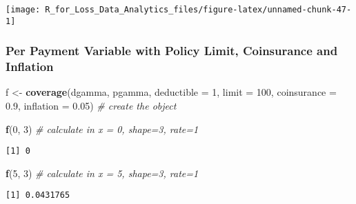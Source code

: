 \documentclass[]{book}
\newenvironment{Shaded}{\begin{snugshade}}{\end{snugshade}}
\newcommand{\KeywordTok}[1]{\textcolor[rgb]{0.13,0.29,0.53}{\textbf{#1}}}
\newcommand{\DataTypeTok}[1]{\textcolor[rgb]{0.13,0.29,0.53}{#1}}
\newcommand{\DecValTok}[1]{\textcolor[rgb]{0.00,0.00,0.81}{#1}}
\newcommand{\FloatTok}[1]{\textcolor[rgb]{0.00,0.00,0.81}{#1}}
\newcommand{\StringTok}[1]{\textcolor[rgb]{0.31,0.60,0.02}{#1}}
\newcommand{\CommentTok}[1]{\textcolor[rgb]{0.56,0.35,0.01}{\textit{#1}}}
\newcommand{\NormalTok}[1]{#1}
\theoremstyle{definition}
\theoremstyle{definition}
\theoremstyle{definition}
\theoremstyle{remark}
\begin{document}
\begin{center}\texttt{[image: R\_for\_Loss\_Data\_Analytics\_files/figure-latex/unnamed-chunk-47-1]} \end{center}

\subsubsection{Per Payment Variable with Policy Limit, Coinsurance and
Inflation}\label{per-payment-variable-with-policy-limit-coinsurance-and-inflation}

\begin{Shaded}
\begin{Highlighting}[]
\NormalTok{f <-}\StringTok{ }\KeywordTok{coverage}\NormalTok{(dgamma, pgamma, }\DataTypeTok{deductible =} \DecValTok{1}\NormalTok{, }\DataTypeTok{limit =} \DecValTok{100}\NormalTok{, }\DataTypeTok{coinsurance =} \FloatTok{0.9}\NormalTok{, }\DataTypeTok{inflation =} \FloatTok{0.05}\NormalTok{) }\CommentTok{# create the object}

\KeywordTok{f}\NormalTok{(}\DecValTok{0}\NormalTok{, }\DecValTok{3}\NormalTok{) }\CommentTok{# calculate in x = 0, shape=3, rate=1}
\end{Highlighting}
\end{Shaded}

\begin{verbatim}
[1] 0
\end{verbatim}

\begin{Shaded}
\begin{Highlighting}[]
\KeywordTok{f}\NormalTok{(}\DecValTok{5}\NormalTok{, }\DecValTok{3}\NormalTok{) }\CommentTok{# calculate in x = 5, shape=3, rate=1}
\end{Highlighting}
\end{Shaded}

\begin{verbatim}
[1] 0.0431765
\end{verbatim}
\end{document}
